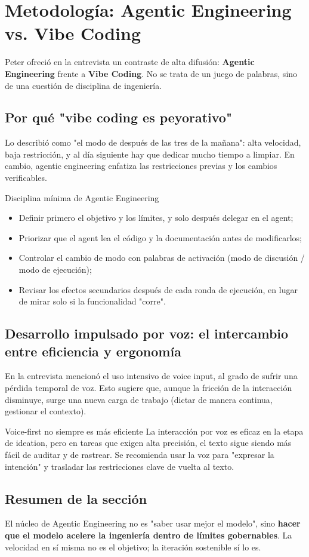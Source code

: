 \section{Metodología: Agentic Engineering vs. Vibe Coding}

Peter ofreció en la entrevista un contraste de alta difusión: \textbf{Agentic Engineering} frente a \textbf{Vibe Coding}. No se trata de un juego de palabras, sino de una cuestión de disciplina de ingeniería.

\subsection{Por qué "vibe coding es peyorativo"}

Lo describió como "el modo de después de las tres de la mañana": alta velocidad, baja restricción, y al día siguiente hay que dedicar mucho tiempo a limpiar. En cambio, agentic engineering enfatiza las restricciones previas y los cambios verificables.

\begin{importantbox}{Disciplina mínima de Agentic Engineering}
\begin{itemize}
    \item Definir primero el objetivo y los límites, y solo después delegar en el agent;
    \item Priorizar que el agent lea el código y la documentación antes de modificarlos;
    \item Controlar el cambio de modo con palabras de activación (modo de discusión / modo de ejecución);
    \item Revisar los efectos secundarios después de cada ronda de ejecución, en lugar de mirar solo si la funcionalidad "corre".
\end{itemize}
\end{importantbox}

\subsection{Desarrollo impulsado por voz: el intercambio entre eficiencia y ergonomía}

En la entrevista mencionó el uso intensivo de voice input, al grado de sufrir una pérdida temporal de voz. Esto sugiere que, aunque la fricción de la interacción disminuye, surge una nueva carga de trabajo (dictar de manera continua, gestionar el contexto).

\begin{warningbox}{Voice-first no siempre es más eficiente}
La interacción por voz es eficaz en la etapa de ideation, pero en tareas que exigen alta precisión, el texto sigue siendo más fácil de auditar y de rastrear. Se recomienda usar la voz para "expresar la intención" y trasladar las restricciones clave de vuelta al texto.
\end{warningbox}

\subsection{Resumen de la sección}
El núcleo de Agentic Engineering no es "saber usar mejor el modelo", sino \textbf{hacer que el modelo acelere la ingeniería dentro de límites gobernables}. La velocidad en sí misma no es el objetivo; la iteración sostenible sí lo es.

